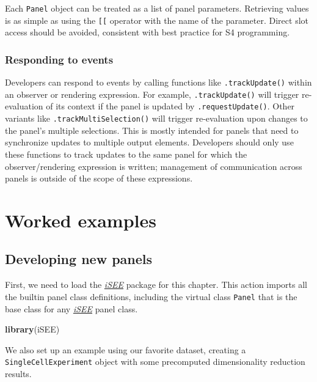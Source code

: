 \documentclass[
]{book}
\newenvironment{Shaded}{\begin{snugshade}}{\end{snugshade}}
\newcommand{\KeywordTok}[1]{\textcolor[rgb]{0.13,0.29,0.53}{\textbf{#1}}}
\newcommand{\NormalTok}[1]{#1}
\begin{document}
Each \texttt{Panel} object can be treated as a list of panel parameters.
Retrieving values is as simple as using the \texttt{{[}{[}} operator with the name of the parameter.
Direct slot access should be avoided, consistent with best practice for S4 programming.

\hypertarget{responding-to-events}{%
\section{Responding to events}\label{responding-to-events}}

Developers can respond to events by calling functions like \texttt{.trackUpdate()} within an observer or rendering expression.
For example, \texttt{.trackUpdate()} will trigger re-evaluation of its context if the panel is updated by \texttt{.requestUpdate()}.
Other variants like \texttt{.trackMultiSelection()} will trigger re-evaluation upon changes to the panel's multiple selections.
This is mostly intended for panels that need to synchronize updates to multiple output elements.
Developers should only use these functions to track updates to the same panel for which the observer/rendering expression is written; management of communication across panels is outside of the scope of these expressions.

\hypertarget{part-worked-examples}{%
\part{Worked examples}\label{part-worked-examples}}

\hypertarget{developing}{%
\chapter{Developing new panels}\label{developing}}

First, we need to load the \emph{\href{https://bioconductor.org/packages/3.11/iSEE}{iSEE}} package for this chapter.
This action imports all the builtin panel class definitions, including the virtual class \texttt{Panel} that is the base class for any \emph{\href{https://bioconductor.org/packages/3.11/iSEE}{iSEE}} panel class.

\begin{Shaded}
\begin{Highlighting}[]
\KeywordTok{library}\NormalTok{(iSEE)}
\end{Highlighting}
\end{Shaded}

We also set up an example using our favorite dataset, creating a \texttt{SingleCellExperiment} object with some precomputed dimensionality reduction results.
\end{document}
